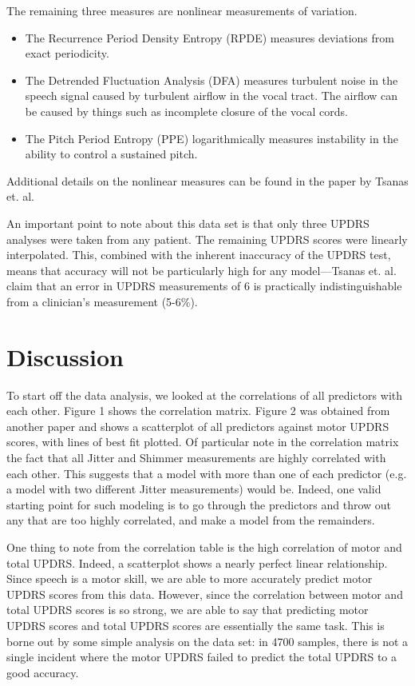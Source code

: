\documentclass{report}
\begin{document}
The remaining three measures are nonlinear measurements of variation.

\begin{itemize}
\item The Recurrence Period Density Entropy (RPDE) measures deviations from exact periodicity. 
\item The Detrended Fluctuation Analysis (DFA) measures turbulent noise in the speech signal caused by turbulent airflow in the vocal tract. The airflow can be caused by things such as
incomplete closure of the vocal cords.
\item The Pitch Period Entropy (PPE) logarithmically measures instability in the ability to control a sustained pitch.
\end{itemize}

Additional details on the nonlinear measures can be found in the paper by Tsanas et. al.\cite{main}

An important point to note about this data set is that only three UPDRS analyses were taken from any patient. The remaining UPDRS scores were linearly interpolated. This, combined
with the inherent inaccuracy of the UPDRS test, means that accuracy will not be particularly high for any model---Tsanas et. al. claim that an error in UPDRS measurements of 6 is
practically indistinguishable from a clinician's measurement (5-6\%).\cite{main}

\section*{Discussion}

To start off the data analysis, we looked at the correlations of all predictors with each other. Figure 1 shows the correlation matrix. Figure 2 was obtained from
another paper \cite{main} and shows a scatterplot of all predictors against motor UPDRS scores, with lines of best fit plotted. 
Of particular note in the correlation matrix the fact that all Jitter and Shimmer measurements are highly correlated with
each other. This suggests that a model with more than one of each predictor (e.g. a model with two different Jitter measurements) would be. Indeed, one valid
starting point for such modeling is to go through the predictors and throw out any that are too highly correlated, and make a model from the remainders.

One thing to note from the correlation table is the high correlation of motor and total UPDRS. Indeed, a scatterplot shows a nearly perfect linear relationship. Since speech is a motor skill, we are able to
more accurately predict motor UPDRS scores from this data. However, since the correlation between motor and total UPDRS scores is so strong, we are able to say that predicting motor UPDRS scores and
total UPDRS scores are essentially the same task. This is borne out by some simple analysis on the data set: in 4700 samples, there is not a single incident where the motor UPDRS failed to predict
the total UPDRS to a good accuracy.
\end{document}

